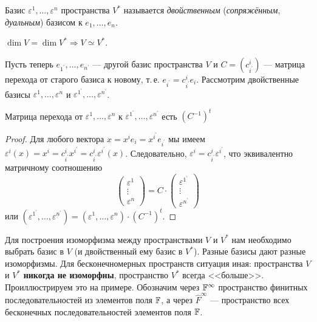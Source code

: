 \begin{definition}
    Базис $\varepsilon^1, \ldots, \varepsilon^n$ пространства $V^\ast$ называется \textit{двойственным} (\textit{сопряжённым}, \textit{дуальным}) базисом к $e_1, \ldots, e_n$.
\end{definition}

\begin{corollary}
    $\dim V = \dim V^\ast \Rightarrow V \simeq V^\ast$.
\end{corollary}

Пусть теперь $e_{1^\prime}, \ldots, e_{n^\prime}$ --- другой базис пространства $V$ и $C = (c^i_{i^\prime})$ --- матрица перехода от старого базиса к новому, т.\,е. $e_{i^\prime} = c^i_{i^\prime}e_i$. Рассмотрим двойственные базисы $\varepsilon^1, \ldots, \varepsilon^n$ и $\varepsilon^{1^\prime}, \ldots, \varepsilon^{n^\prime}$.

\begin{proposal}
    Матрица перехода от $\varepsilon^1, \ldots, \varepsilon^n$ к $\varepsilon^{1^\prime}, \ldots, \varepsilon^{n^\prime}$ есть $(C^{-1})^t$
\end{proposal}

\begin{proof}
    Для любого вектора $x = x^ie_i = x^{i^\prime}e_{i^\prime}$ мы имеем $\varepsilon^i(x) = x^i = c^i_{i^\prime}x^{i^\prime} = c^i_{i^\prime}\varepsilon^{i^\prime}(x)$. Следовательно, $\varepsilon^i = c^i_{i^\prime}\varepsilon^{i^\prime}$, что эквивалентно матричному соотношению
    \[
        \begin{pmatrix}
            \varepsilon^1\\
            \vdots\\
            \varepsilon^n
        \end{pmatrix} = C \cdot
        \begin{pmatrix}
            \varepsilon^{1^\prime}\\
            \vdots\\
            \varepsilon^{n^\prime}
        \end{pmatrix}
    \]
    или $(\varepsilon^{1^\prime}, \ldots, \varepsilon^{n^\prime}) = (\varepsilon^1, \ldots, \varepsilon^n) \cdot (C^{-1})^t$.
\end{proof}

Для построения изоморфизма между пространствами $V$ и $V^\ast$ нам необходимо выбрать базис в $V$ (и двойственный ему базис в $V^\ast$). Разные базисы дают разные изоморфизмы. Для бесконечномерных пространств ситуация иная: пространства $V$ и $V^\ast$ \textbf{никогда не изоморфны}, пространство $V^\ast$ всегда <<больше>>. Проиллюстрируем это на примере. Обозначим через $\mathbb{F}^\infty$ пространство финитных последовательностей из элементов поля $\mathbb{F}$, а через $\widehat{F}^\infty$ --- пространство всех бесконечных последовательностей элементов поля $\mathbb{F}$.

